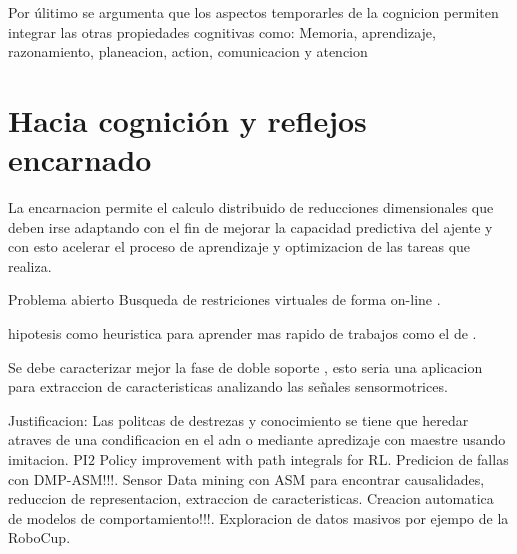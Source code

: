 Por \'ulitimo se argumenta que los aspectos temporarles de la cognicion permiten integrar las otras propiedades cognitivas como: Memoria, aprendizaje, razonamiento, planeacion, action, comunicacion y atencion

\section{Hacia cognici\'on y reflejos encarnado}
\label{sec:hacia}

La encarnacion permite el calculo distribuido de reducciones dimensionales que deben irse adaptando con el fin de mejorar la capacidad predictiva del ajente y con esto acelerar el proceso de aprendizaje y optimizacion de las tareas que realiza.

Problema abierto Busqueda de restriciones virtuales de forma on-line \cite{Grizzle2014}. 

hipotesis como heuristica para aprender mas rapido de trabajos como el de \cite{Kuo2001}.

Se debe caracterizar mejor la fase de doble soporte \cite{Grizzle2014}, esto seria una aplicacion para extraccion de caracteristicas analizando las se\~nales sensormotrices.

Justificacion: Las politcas de destrezas y conocimiento se tiene que heredar atraves de una condificacion en el adn o mediante apredizaje con maestre usando imitacion. PI$2$ Policy improvement with path integrals for RL. Predicion de fallas con DMP-ASM!!!. Sensor Data mining  con ASM para encontrar causalidades, reduccion de representacion, extraccion de caracteristicas. Creacion automatica de modelos de comportamiento!!!. Exploracion de datos masivos por ejempo de la RoboCup.

